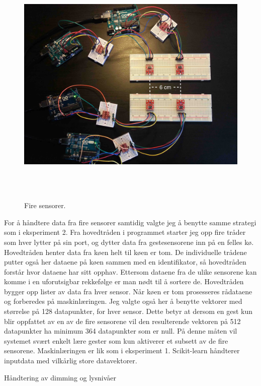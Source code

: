 \begin{figure}[h]
\centering
\includegraphics[width=15cm, height=12cm]{fig/foursensors}
\caption{Fire sensorer.}
\label{fig:four-sensors}
\end{figure}

For å håndtere data fra fire sensorer samtidig valgte jeg å benytte samme strategi som i eksperiment 2. Fra hovedtråden i programmet starter jeg opp fire tråder som hver lytter på sin port, og dytter data fra gestesensorene inn på en felles kø. Hovedtråden henter data fra køen helt til køen er tom. De individuelle trådene putter også her dataene på køen sammen med en identifikator, så hovedtråden forstår hvor dataene har sitt opphav. Ettersom dataene fra de ulike sensorene kan komme i en uforutsigbar rekkefølge er man nødt til å sortere de. Hovedtråden bygger opp lister av data fra hver sensor. Når køen er tom prosesseres rådataene og forberedes på maskinlæringen. Jeg valgte også her å benytte vektorer med størrelse på 128 datapunkter, for hver sensor. Dette betyr at dersom en gest kun blir oppfattet av en av de fire sensorene vil den resulterende vektoren på 512 datapunkter ha minimum 364 datapunkter som er null. På denne måten vil systemet svært enkelt lære gester som kun aktiverer et subsett av de fire sensorene. Maskinlæringen er lik som i eksperiment 1. Scikit-learn håndterer inputdata med vilkårlig store datavektorer.

{\color{red}Håndtering av dimming og lysnivåer}

